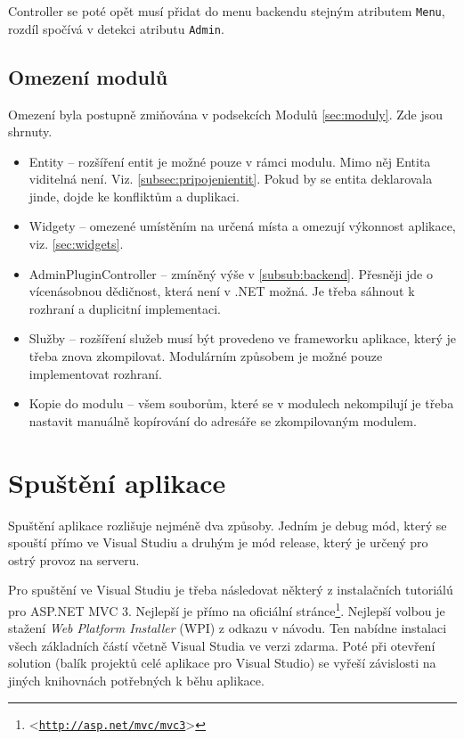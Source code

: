 \documentclass[11pt,twoside,a4paper]{book}
\let\oldUrl\url
\renewcommand\url[1]{<\texttt{\oldUrl{#1}}>}
\begin{document}
Controller se poté opět musí přidat do menu backendu stejným atributem \texttt{Menu}, rozdíl spočívá v detekci atributu \texttt{Admin}. 

\subsection{Omezení modulů}

Omezení byla postupně zmiňována v podsekcích Modulů \ref{sec:moduly}. Zde jsou shrnuty.

\begin{itemize}
\item Entity -- rozšíření entit je možné pouze v rámci modulu. Mimo něj Entita viditelná není. Viz. \ref{subsec:pripojenientit}. Pokud by se entita deklarovala jinde, dojde ke konfliktům a duplikaci.
\item Widgety -- omezené umístěním na určená místa a omezují výkonnost aplikace, viz. \ref{sec:widgets}.
\item AdminPluginController -- zmíněný výše v \ref{subsub:backend}. Přesněji jde o vícenásobnou dědičnost, která není v .NET možná. Je třeba sáhnout k rozhraní a duplicitní implementaci.
\item Služby -- rozšíření služeb musí být provedeno ve frameworku aplikace, který je třeba znova zkompilovat. Modulárním způsobem je možné pouze implementovat rozhraní.
\item Kopie do modulu -- všem souborům, které se v modulech nekompilují je třeba nastavit manuálně kopírování do adresáře se zkompilovaným modulem.
\end{itemize}



\section{Spuštění aplikace}

Spuštění aplikace rozlišuje nejméně dva způsoby. Jedním je debug mód, který se spouští přímo ve Visual Studiu a druhým je mód release, který je určený pro ostrý provoz na serveru.

Pro spuštění ve Visual Studiu je třeba následovat některý z instalačních tutoriálú pro ASP.NET MVC 3. Nejlepší je přímo na oficiální stránce\footnote{\url{http://asp.net/mvc/mvc3}}. Nejlepší volbou je stažení \textit{Web Platform Installer} (WPI) z odkazu v návodu. Ten nabídne instalaci všech základních částí včetně Visual Studia ve verzi zdarma. Poté při otevření \textsf{solution} (balík projektů celé aplikace pro Visual Studio) se vyřeší závislosti na jiných knihovnách potřebných k běhu aplikace.
\end{document}
